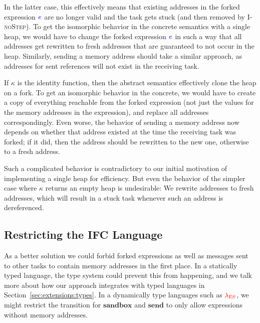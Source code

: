 \documentclass{sigplanconf}
\newcommand{\Varid}[1]{\mathit{#1}}
\newcommand{\Red}[1]{{\color{red} #1}}
\begin{document}
{\color{blue}
In the latter case, this effectively means that existing addresses
in the forked expression \ensuremath{\ifc{\Varid{e}}} are no longer valid and the
task gets stuck (and then removed by \textsc{I-noStep}).
To get the isomorphic behavior in the concrete semantics with a
single heap, we would have to change the forked expression \ensuremath{\ifc{\Varid{e}}} in
such a way that all addresses get rewritten to fresh addresses
that are guaranteed to not occur in the heap.  Similarly,
sending a memory address should take a similar approach, as addresses
for sent references will not exist in the receiving task.

If \ensuremath{\kappa} is the identity function, then the abstract semantics
effectively clone the heap on a fork.  To get an isomorphic
behavior in the concrete, we would have to create a copy of everything
reachable from the forked expression (not just the values for
the memory addresses in the expression), and replace all addresses
correspondingly.  Even worse, the behavior of sending a memory address
now depends on whether that address existed at the time the receiving
task was forked;  if it did, then the address should be rewritten to the
new one, otherwise to a fresh address.

Such a complicated behavior is contradictory to our initial motivation
of implementing a single heap for efficiency.  But even the
behavior of the simpler case where \ensuremath{\kappa} returns an empty heap is
undesirable:  We rewrite addresses to fresh addresses, which will
result in a stuck task whenever such an address is dereferenced.
}



\subsection{Restricting the IFC Language}

As a better solution we could forbid forked expressions as well
as messages sent to other tasks to contain memory addresses in the
first place.  In a statically typed language, the type system could
prevent this from happening, and we talk more about how our
approach integrates with typed languages in
Section~\ref{sec:extensions:types}.
In a dynamically type languages such as \ensuremath{\Red{\lambda_{\text{ES}}}}, we might
restrict the transition for \ensuremath{\mathbf{sandbox}} and \ensuremath{\mathbf{send}} to only allow expressions
without memory addresses.
\end{document}
